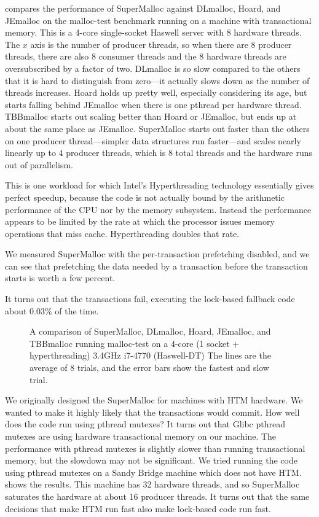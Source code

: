\documentclass{sigplanconf}
\begin{document}
 compares the performance of SuperMalloc against
DLmalloc, Hoard, and JEmalloc on the malloc-test benchmark running on
a machine with transactional memory.  This is a 4-core single-socket
Haswell server with 8 hardware threads.  The $x$ axis is the number of
producer threads, so when there are $8$ producer threads, there are
also $8$ consumer threads and the 8 hardware threads are
oversubscribed by a factor of two.  DLmalloc is so slow compared to
the others that it is hard to distinguish from zero---it actually
slows down as the number of threads increases.  Hoard holds up pretty
well, especially considering its age, but starts falling behind
JEmalloc when there is one pthread per hardware thread.  TBBmalloc
starts out scaling better than Hoard or JEmalloc, but ends up at about
the same place as JEmalloc.  SuperMalloc starts out faster than the
others on one producer thread---simpler data structures run
faster---and scales nearly linearly up to 4 producer threads, which is
8 total threads and the hardware runs out of parallelism.

This is one workload for which Intel's Hyperthreading technology
essentially gives perfect speedup, because the code is not actually
bound by the arithmetic performance of the CPU nor by the memory
subsystem.  Instead the performance appears to be limited by the rate
at which the processor issues memory operations that miss cache.
Hyperthreading doubles that rate.

We measured SuperMalloc with the per-transaction prefetching disabled,
and we can see that prefetching the data needed by a transaction
before the transaction starts is worth a few percent.

It turns out that the transactions fail, executing the lock-based
fallback code about $0.03$\% of the time.

\begin{figure}

\caption{A comparison of SuperMalloc, DLmalloc, Hoard,
  JEmalloc, and TBBmalloc running malloc-test
  on a 4-core (1 socket + hyperthreading) 3.4GHz i7-4770 (Haswell-DT)
  The lines are the average of 8 trials, and the error bars
  show the fastest and slow trial.}
\label{fig:datahtm}
\vspace*{-3ex}
\end{figure}

We originally designed the SuperMalloc for machines with HTM hardware.
We wanted to make it highly likely that the transactions would commit.
How well does the code run using pthread mutexes?  It turns out that
Glibc pthread mutexes are using hardware transactional memory on our
machine.  The performance with pthread mutexes is slightly slower than
running transactional memory, but the slowdown may not be significant.
We tried running the code using pthread mutexes on a Sandy Bridge
machine which does not have HTM\@.   shows the
results. This machine has 32 hardware threads, and so SuperMalloc
saturates the hardware at about 16 producer threads.  It turns out
that the same decisions that make HTM run fast also make lock-based
code run fast.
\end{document}
